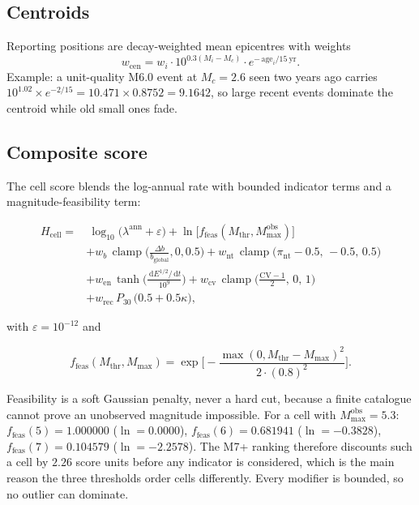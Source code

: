 \documentclass[11pt,a4paper]{article}
\newcommand{\dd}{\,\mathrm{d}}
\DeclareMathOperator{\tanhx}{tanh}
\DeclareMathOperator{\clamp}{clamp}
\begin{document}
\subsection{Centroids}
Reporting positions are decay-weighted mean epicentres with weights
\begin{equation}
w_{\text{cen}}=w_i\cdot10^{0.3(M_i-M_c)}\cdot
e^{-\,\text{age}_i/15\ \text{yr}}.
\end{equation}
Example: a unit-quality M6.0 event at $M_c=2.6$ seen two years ago carries
$10^{1.02}\times e^{-2/15}=10.471\times0.8752=9.1642$, so large recent
events dominate the centroid while old small ones fade.

\subsection{Composite score}\label{sec:composite}
The cell score blends the log-annual rate with bounded indicator terms and a
magnitude-feasibility term:

\begin{align}
H_{\text{cell}}=&\ \log_{10}\!\big(\lambda^{\text{ann}}+\varepsilon\big)
+\ln\!\big[f_{\text{feas}}(M_{\mathrm{thr}},M_{\max}^{\mathrm{obs}})\big]
\nonumber\\
&+w_b\,\clamp\!\Big(\frac{\Delta b}{b_{\text{global}}},0,0.5\Big)
+w_{\mathrm{nt}}\,\clamp\!\big(\pi_{\mathrm{nt}}-0.5,\,-0.5,\,0.5\big)
\nonumber\\
&+w_{\mathrm{en}}\,\tanhx\!\Big(\frac{\dd E^{1/2}/\dd t}{10^9}\Big)
+w_{\mathrm{cv}}\,\clamp\!\Big(\frac{\mathrm{CV}-1}{2},\,0,\,1\Big)
\nonumber\\
&+w_{\mathrm{rec}}\,P_{30}\,\big(0.5+0.5\kappa\big),
\label{eq:composite}
\end{align}

with $\varepsilon=10^{-12}$ and

\begin{equation}
f_{\text{feas}}(M_{\mathrm{thr}},M_{\max})=
\exp\!\Big[-\frac{\max(0,M_{\mathrm{thr}}-M_{\max})^2}{2\cdot(0.8)^2}\Big].
\end{equation}

Feasibility is a soft Gaussian penalty, never a hard cut, because a finite
catalogue cannot prove an unobserved magnitude impossible. For a cell with
$M_{\max}^{\mathrm{obs}}=5.3$: $f_{\text{feas}}(5)=1.000000$ ($\ln=0.0000$),
$f_{\text{feas}}(6)=0.681941$ ($\ln=-0.3828$),
$f_{\text{feas}}(7)=0.104579$ ($\ln=-2.2578$). The M7+ ranking therefore
discounts such a cell by $2.26$ score units before any indicator is
considered, which is the main reason the three thresholds order cells
differently. Every modifier is bounded, so no outlier can dominate.
\end{document}
